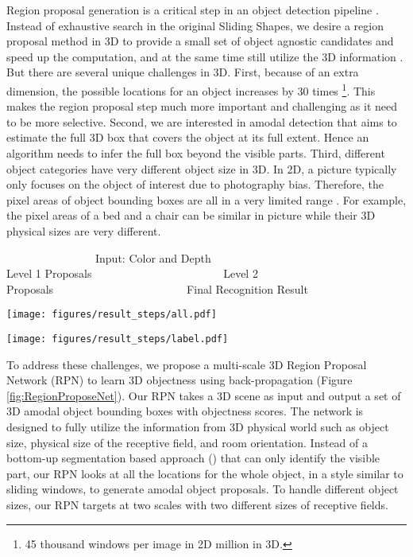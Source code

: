 \documentclass[10pt,twocolumn,letterpaper]{article}
\begin{document}
Region proposal generation is a critical step in an object detection pipeline \cite{RCNN,FastRCNN,FasterRCNN}.
Instead of exhaustive search in the original Sliding Shapes, we desire a region proposal method in 3D to provide a small set of object agnostic candidates and speed up the computation, 
and at the same time still utilize the 3D information .
But there are several unique challenges in 3D.
First, because of an extra dimension, 
the possible locations for an object increases by 30 times \footnote{45 thousand windows per image in 2D \cite{FastRCNN}  million in 3D.}.
This makes the region proposal step much more important and challenging as it need to be more selective.
Second, we are interested in amodal detection that aims to estimate the full 3D box that covers the object at its full extent. Hence an algorithm needs to infer the full box beyond the visible parts.
Third, different object categories have very different object size in 3D.
In 2D, a picture typically only focuses on the object of interest due to photography bias.
Therefore, the pixel areas of object bounding boxes are all in a very limited range \cite{FasterRCNN,RCNNmR}.
For example, the pixel areas of a bed and a chair can be similar in picture while their 3D physical sizes are very different. 



\begin{figure*} [t]
\vspace{-3mm}

{\footnotesize
~~~~~~~~~~~~~~~~Input: Color and Depth~~~~~~~~~~~~~~~~~~~~~~~~~~~~~~~~ Level 1  Proposals~~~~~~~~~~~~~~~~~~~~~~~ Level 2 Proposals~~~~~~~~~~~~~~~~~~~~~~~~Final Recognition Result
}

\centering
\texttt{[image: figures/result\_steps/all.pdf]}

\texttt{[image: figures/result\_steps/label.pdf]}
\caption{{\bf Examples for Detection Results.} 
For the proposal results, we show the heat map for the distribution of the top proposals (red is the area with more concentration),
and a few top boxes after NMS. 
For the recognition results,
our amodal 3D detection can estimate the full extent of 3D both vertically (\eg bottom of a bed)
and horizontally (\eg full size sofa in the last row).
}
\vspace{-3mm}
\end{figure*}

To address these challenges, 
we propose a multi-scale 3D Region Proposal Network (RPN) to learn 3D objectness using back-propagation (Figure \ref{fig:RegionProposeNet}).
Our RPN takes a 3D scene as input and output a set of 3D amodal object bounding boxes with objectness scores.
The network is designed to fully utilize the information from 3D physical world such as object size, physical size of the receptive field, and room orientation.
Instead of a bottom-up segmentation based approach (\eg \cite{SelectiveSearch}) that can only identify the visible part,
our RPN 
looks at all the locations for the whole object, in a style similar to sliding windows, to generate amodal object proposals.
To handle different object sizes, our RPN targets at two scales with two different sizes of receptive fields.
\end{document}
